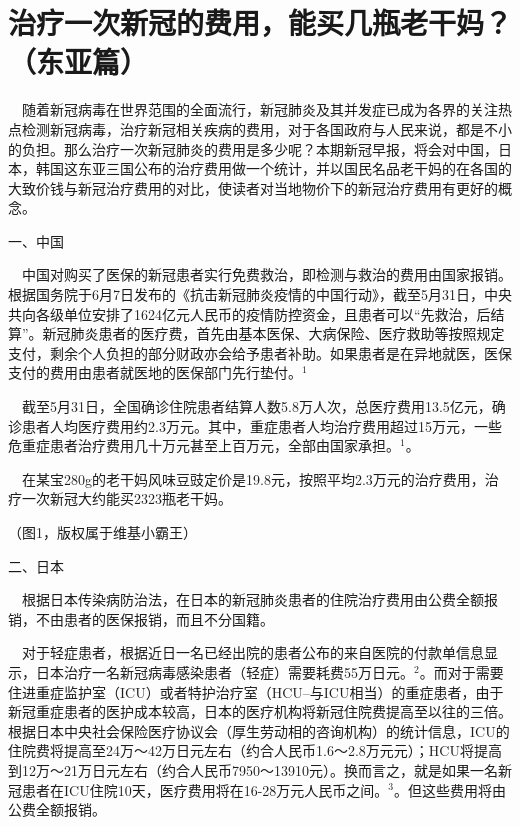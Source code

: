 \documentclass[
]{article}
\begin{document}
\vspace{-5mm}

\hypertarget{section}{%
\section{\texorpdfstring{\textcolor{glaucous}{\Huge 治疗一次新冠的费用，能买几瓶老干妈？（东亚篇）}}{}}\label{section}}

\vspace{-3mm}

\(\quad\)随着新冠病毒在世界范围的全面流行，新冠肺炎及其并发症已成为各界的关注热点检测新冠病毒，治疗新冠相关疾病的费用，对于各国政府与人民来说，都是不小的负担。那么治疗一次新冠肺炎的费用是多少呢？本期新冠早报，将会对中国，日本，韩国这东亚三国公布的治疗费用做一个统计，并以国民名品老干妈的在各国的大致价钱与新冠治疗费用的对比，使读者对当地物价下的新冠治疗费用有更好的概念。

一、中国

\(\quad\)中国对购买了医保的新冠患者实行免费救治，即检测与救治的费用由国家报销。根据国务院于6月7日发布的《抗击新冠肺炎疫情的中国行动》，截至5月31日，中央共向各级单位安排了1624亿元人民币的疫情防控资金，且患者可以``先救治，后结算''。新冠肺炎患者的医疗费，首先由基本医保、大病保险、医疗救助等按照规定支付，剩余个人负担的部分财政亦会给予患者补助。如果患者是在异地就医，医保支付的费用由患者就医地的医保部门先行垫付。\(^1\)

\(\quad\)截至5月31日，全国确诊住院患者结算人数5.8万人次，总医疗费用13.5亿元，确诊患者人均医疗费用约2.3万元。其中，重症患者人均治疗费用超过15万元，一些危重症患者治疗费用几十万元甚至上百万元，全部由国家承担。\(^1\)。

\(\quad\)在某宝280g的老干妈风味豆豉定价是19.8元，按照平均2.3万元的治疗费用，治疗一次新冠大约能买2323瓶老干妈。

\vspace{5mm}

\Large （图1，版权属于维基小霸王）

二、日本

\(\quad\)根据日本传染病防治法，在日本的新冠肺炎患者的住院治疗费用由公费全额报销，不由患者的医保报销，而且不分国籍。

\(\quad\)对于轻症患者，根据近日一名已经出院的患者公布的来自医院的付款单信息显示，日本治疗一名新冠病毒感染患者（轻症）需要耗费55万日元。\(^2\)。而对于需要住进重症监护室（ICU）或者特护治疗室（HCU--与ICU相当）的重症患者，由于新冠重症患者的医护成本较高，日本的医疗机构将新冠住院费提高至以往的三倍。根据日本中央社会保险医疗协议会（厚生劳动相的咨询机构）的统计信息，ICU的住院费将提高至24万～42万日元左右（约合人民币1.6～2.8万元元）；HCU将提高到12万～21万日元左右（约合人民币7950～13910元）。换而言之，就是如果一名新冠患者在ICU住院10天，医疗费用将在16-28万元人民币之间。\(^3\)。但这些费用将由公费全额报销。
\end{document}
